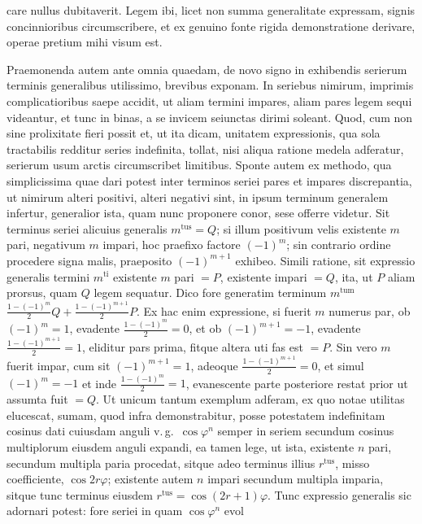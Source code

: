 care nullus dubitaverit. Legem ibi, licet non summa generalitate expressam,
signis concinnioribus circumscribere, et ex genuino fonte rigida demonstratione
derivare, operae pretium mihi visum est.

Praemonenda autem ante omnia quaedam, de novo signo in exhibendis serierum
terminis generalibus utilissimo, brevibus exponam. In seriebus nimirum,
imprimis complicatioribus saepe accidit, ut aliam termini impares, aliam
pares legem sequi videantur, et tunc in binas, a se invicem seiunctas dirimi
soleant. Quod, cum non sine prolixitate fieri possit et, ut ita dicam,
unitatem expressionis, qua sola tractabilis redditur series indefinita,
tollat, nisi aliqua ratione medela adferatur, serierum usum arctis
circumscribet limitibus. Sponte autem ex methodo, qua simplicissima quae
dari potest inter terminos seriei pares et impares discrepantia, ut nimirum
alteri positivi, alteri negativi sint, in ipsum terminum generalem infertur,
generalior ista, quam nunc proponere conor, sese offerre videtur. Sit
terminus seriei alicuius generalis $m^{\text{tus}} = Q$; si illum positivum
velis existente $m$ pari, negativum $m$ impari, hoc praefixo factore
$(-1)^m$; sin contrario ordine procedere signa malis, praeposito
$(-1)^{m+1}$ exhibeo. Simili ratione, sit expressio generalis termini
$m^{\text{ti}}$ existente $m$ pari $= P$, existente impari $= Q$, ita, ut
$P$ aliam prorsus, quam $Q$ legem sequatur. Dico fore generatim terminum
$m^{\text{tum}}$ $\frac{1-(-1)^m}{2}Q+\frac{1-(-1)^{m+1}}{2}P$. Ex hac enim
expressione, si fuerit $m$ numerus par, ob $(-1)^m=1$, evadente
$\frac{1-(-1)^m}{2}=0$, et ob $(-1)^{m+1}=-1$, evadente
$\frac{1-(-1)^{m+1}}{2}=1$, eliditur pars prima, fitque altera uti fas est
$=P$. Sin vero $m$ fuerit impar, cum sit $(-1)^{m+1}=1$, adeoque
$\frac{1-(-1)^{m+1}}{2}=0$, et simul $(-1)^m=-1$ et inde
$\frac{1-(-1)^m}{2}=1$, evanescente parte posteriore restat prior ut
assumta fuit $=Q$. Ut unicum tantum exemplum adferam, ex quo notae utilitas
elucescat, sumam, quod infra demonstrabitur, posse potestatem indefinitam
cosinus dati cuiusdam anguli v.\,g.\ $\cos\varphi^n$ semper in seriem
secundum cosinus multiplorum eiusdem anguli expandi, ea tamen lege, ut ista,
existente $n$ pari, secundum multipla paria procedat, sitque adeo terminus
illius $r^{\text{tus}}$, misso coefficiente, $\cos 2r\varphi$; existente
autem $n$ impari secundum multipla imparia, sitque tunc terminus
eiusdem $r^{\text{tus}} = \cos(2r+1)\varphi$. Tunc expressio generalis sic
adornari potest: fore seriei in quam $\cos\varphi^n$ evol%
